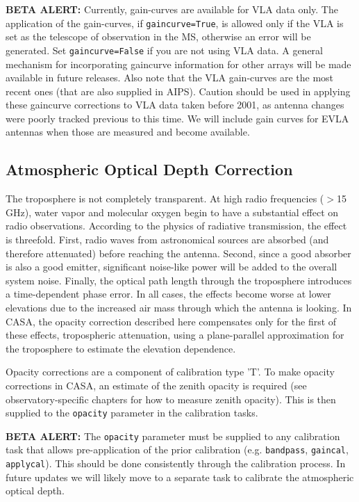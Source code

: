 {\bf BETA ALERT:} Currently, gain-curves are available for VLA data
only.  The application of the gain-curves, if {\tt gaincurve=True},
is allowed only if the VLA is set as the telescope of observation
in the MS, otherwise an error will be generated.
Set {\tt gaincurve=False} if you are not using VLA data.  
A general mechanism for incorporating gaincurve information for
other arrays will be made available in future releases.
Also note that the VLA gain-curves are the most recent ones (that are
also supplied in AIPS).   Caution should be used in applying
these gaincurve corrections to VLA data taken before 2001, as 
antenna changes were poorly tracked previous to this time.
We will include gain curves for EVLA antennas when those are measured
and become available.

\subsection{Atmospheric Optical Depth Correction}
\label{section:cal.prior.opacity}

The troposphere is not completely transparent.  At high radio
frequencies ($>$15 GHz), water vapor and molecular oxygen begin to
have a substantial effect on radio observations. According to the
physics of radiative transmission, the effect is threefold.  First,
radio waves from astronomical sources are absorbed (and therefore
attenuated) before reaching the antenna.  Second, since a good absorber
is also a good emitter, significant noise-like power will be added to
the overall system noise.  Finally, the optical path length through
the troposphere introduces a time-dependent phase error.  In all
cases, the effects become worse at lower elevations due to the
increased air mass through which the antenna is looking.  In CASA,
the opacity correction described here compensates only for the first
of these effects, tropospheric attenuation, using a plane-parallel
approximation for the troposphere to estimate the elevation
dependence.

Opacity corrections are a component of calibration type 'T'.  To make
opacity corrections in CASA, an estimate of the zenith opacity is
required (see observatory-specific chapters for how to measure zenith
opacity).  This is then supplied to the {\tt opacity} parameter in
the calibration tasks.

{\bf BETA ALERT:} The {\tt opacity} parameter must be supplied
to any calibration task that allows pre-application of the prior
calibration (e.g. {\tt bandpass}, {\tt gaincal}, {\tt applycal}).
This should be done consistently through the calibration process.
In future updates we will likely move to a separate task to
calibrate the atmospheric optical depth.

